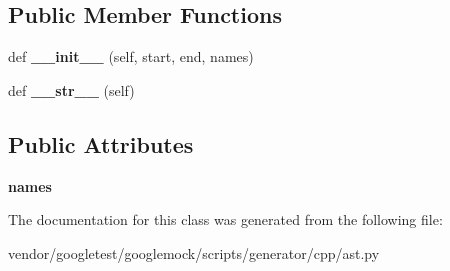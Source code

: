 \subsection*{Public Member Functions}
\begin{DoxyCompactItemize}
\item 
def {\bfseries \+\_\+\+\_\+init\+\_\+\+\_\+} (self, start, end, names)\hypertarget{classcpp_1_1ast_1_1Using_a9b7a760a06d00f7211c889d9841e06af}{}\label{classcpp_1_1ast_1_1Using_a9b7a760a06d00f7211c889d9841e06af}

\item 
def {\bfseries \+\_\+\+\_\+str\+\_\+\+\_\+} (self)\hypertarget{classcpp_1_1ast_1_1Using_ac209e8e5d84988d14a8f4b30377e5455}{}\label{classcpp_1_1ast_1_1Using_ac209e8e5d84988d14a8f4b30377e5455}

\end{DoxyCompactItemize}
\subsection*{Public Attributes}
\begin{DoxyCompactItemize}
\item 
{\bfseries names}\hypertarget{classcpp_1_1ast_1_1Using_abc05dedb59eb83857d373cc0e64eccb3}{}\label{classcpp_1_1ast_1_1Using_abc05dedb59eb83857d373cc0e64eccb3}

\end{DoxyCompactItemize}


The documentation for this class was generated from the following file\+:\begin{DoxyCompactItemize}
\item 
vendor/googletest/googlemock/scripts/generator/cpp/ast.\+py\end{DoxyCompactItemize}
